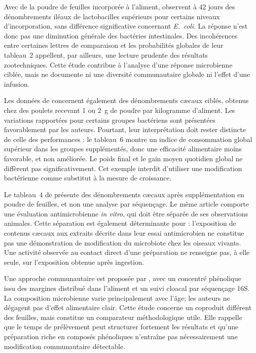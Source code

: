 Avec de la poudre de feuilles incorporée à l'aliment, \citet{Amini2019} observent à 42 jours des dénombrements iléaux de lactobacilles supérieurs pour certains niveaux d'incorporation, sans différence significative concernant \textit{E.~coli}. La réponse n'est donc pas une diminution générale des bactéries intestinales. Des incohérences entre certaines lettres de comparaison et les probabilités globales de leur tableau~2 appellent, par ailleurs, une lecture prudente des résultats zootechniques. Cette étude contribue à l'analyse d'une réponse microbienne ciblée, mais ne documente ni une diversité communautaire globale ni l'effet d'une infusion.

Les données de \citet{Negm2025} concernent également des dénombrements cæcaux ciblés, obtenus chez des poulets recevant 1 ou 2~g de poudre par kilogramme d'aliment. Les variations rapportées pour certains groupes bactériens sont présentées favorablement par les auteurs. Pourtant, leur interprétation doit rester distincte de celle des performances : le tableau~6 montre un indice de consommation global supérieur dans les groupes supplémentés, donc une efficacité alimentaire moins favorable, et non améliorée. Le poids final et le gain moyen quotidien global ne diffèrent pas significativement. Cet exemple interdit d'utiliser une modification bactérienne comme substitut à la mesure de croissance.

Le tableau~4 de \citet{Almuhayawi2023} présente des dénombrements cæcaux après supplémentation en poudre de feuilles, et non une analyse par séquençage. Le même article comporte une évaluation antimicrobienne \textit{in vitro}, qui doit être séparée de ses observations animales. Cette séparation est également déterminante pour \citet{Jabri2017} : l'exposition de contenus cæcaux aux extraits décrite dans leur essai antimicrobien ne constitue pas une démonstration de modification du microbiote chez les oiseaux vivants. Une activité observée au contact direct d'une préparation ne renseigne pas, à elle seule, sur l'exposition obtenue après ingestion.

Une approche communautaire est proposée par \citet{Balzan2021}, avec un concentré phénolique issu des margines distribué dans l'aliment et un suivi cloacal par séquençage 16S. La composition microbienne varie principalement avec l'âge; les auteurs ne dégagent pas d'effet alimentaire clair. Cette étude concerne un coproduit différent des feuilles, mais constitue un comparateur méthodologique utile. Elle rappelle que le temps de prélèvement peut structurer fortement les résultats et qu'une préparation riche en composés phénoliques n'entraîne pas nécessairement une modification communautaire détectable.

